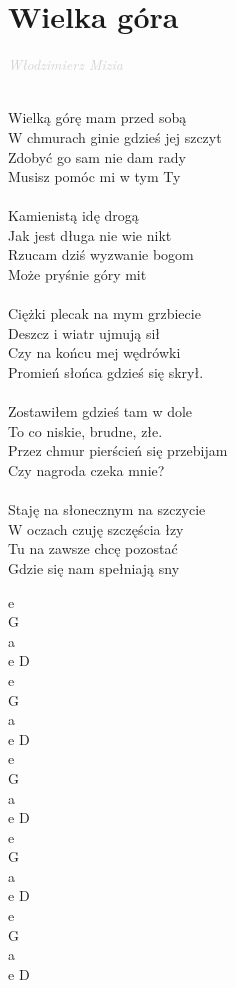 \documentclass[a5paper, 10pt]{book}
\begin{document}
\newpage
\section{Wielka góra}\textcolor{lightgray}{\textit{Włodzimierz Mizia\\}}~\\
\begin{minipage}[t]{0.7\textwidth}
Wielką górę mam przed sobą 			\\
W chmurach ginie gdzieś jej szczyt 		\\
Zdobyć go sam nie dam rady 			\\
Musisz pomóc mi w tym Ty 			\\
\\
Kamienistą idę drogą 					\\
Jak jest długa nie wie nikt 					\\
Rzucam dziś wyzwanie bogom\\
 Może pryśnie góry mit \\
\\
Ciężki plecak na mym grzbiecie\\
 Deszcz i wiatr ujmują sił \\
Czy na końcu mej wędrówki \\
Promień słońca gdzieś się skrył. \\
\\
Zostawiłem gdzieś tam w dole \\
To co niskie, brudne, złe. \\
Przez chmur pierścień się przebijam \\
Czy nagroda czeka mnie? \\
\\
Staję na słonecznym na szczycie\\
 W oczach czuję szczęścia łzy \\
Tu na zawsze chcę pozostać\\
 Gdzie się nam spełniają sny\\
\end{minipage}
\begin{minipage}[t]{0.3\textwidth}
e\\
G\\
a\\
e D\\

e\\
G\\
a\\
e D\\

e\\
G\\
a\\
e D\\

e\\
G\\
a\\
e D\\

e\\
G\\
a\\
e D\\


\end{minipage}
\end{document}
